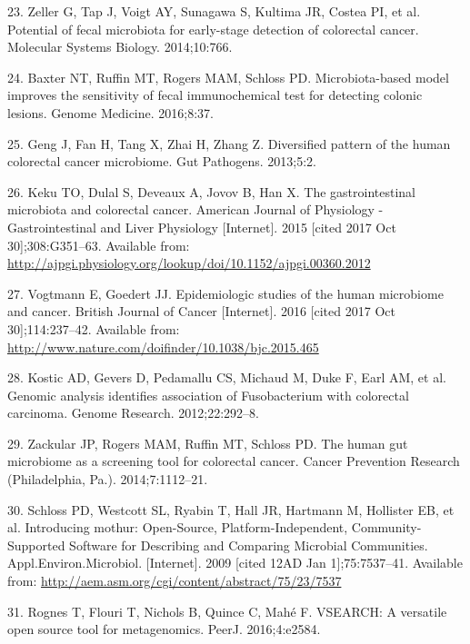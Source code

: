 \documentclass[12pt,]{article}
\begin{document}
\hypertarget{ref-zeller_potential_2014}{}
23. Zeller G, Tap J, Voigt AY, Sunagawa S, Kultima JR, Costea PI, et al.
Potential of fecal microbiota for early-stage detection of colorectal
cancer. Molecular Systems Biology. 2014;10:766.

\hypertarget{ref-baxter_microbiota-based_2016}{}
24. Baxter NT, Ruffin MT, Rogers MAM, Schloss PD. Microbiota-based model
improves the sensitivity of fecal immunochemical test for detecting
colonic lesions. Genome Medicine. 2016;8:37.

\hypertarget{ref-geng_diversified_2013}{}
25. Geng J, Fan H, Tang X, Zhai H, Zhang Z. Diversified pattern of the
human colorectal cancer microbiome. Gut Pathogens. 2013;5:2.

\hypertarget{ref-keku_gastrointestinal_2015}{}
26. Keku TO, Dulal S, Deveaux A, Jovov B, Han X. The gastrointestinal
microbiota and colorectal cancer. American Journal of Physiology -
Gastrointestinal and Liver Physiology {[}Internet{]}. 2015 {[}cited 2017
Oct 30{]};308:G351--63. Available from:
\url{http://ajpgi.physiology.org/lookup/doi/10.1152/ajpgi.00360.2012}

\hypertarget{ref-vogtmann_epidemiologic_2016}{}
27. Vogtmann E, Goedert JJ. Epidemiologic studies of the human
microbiome and cancer. British Journal of Cancer {[}Internet{]}. 2016
{[}cited 2017 Oct 30{]};114:237--42. Available from:
\url{http://www.nature.com/doifinder/10.1038/bjc.2015.465}

\hypertarget{ref-kostic_genomic_2012}{}
28. Kostic AD, Gevers D, Pedamallu CS, Michaud M, Duke F, Earl AM, et
al. Genomic analysis identifies association of Fusobacterium with
colorectal carcinoma. Genome Research. 2012;22:292--8.

\hypertarget{ref-zackular_human_2014}{}
29. Zackular JP, Rogers MAM, Ruffin MT, Schloss PD. The human gut
microbiome as a screening tool for colorectal cancer. Cancer Prevention
Research (Philadelphia, Pa.). 2014;7:1112--21.

\hypertarget{ref-schloss_introducing_2009}{}
30. Schloss PD, Westcott SL, Ryabin T, Hall JR, Hartmann M, Hollister
EB, et al. Introducing mothur: Open-Source, Platform-Independent,
Community-Supported Software for Describing and Comparing Microbial
Communities. Appl.Environ.Microbiol. {[}Internet{]}. 2009 {[}cited 12AD
Jan 1{]};75:7537--41. Available from:
\url{http://aem.asm.org/cgi/content/abstract/75/23/7537}

\hypertarget{ref-rognes_vsearch_2016}{}
31. Rognes T, Flouri T, Nichols B, Quince C, Mahé F. VSEARCH: A
versatile open source tool for metagenomics. PeerJ. 2016;4:e2584.
\end{document}
